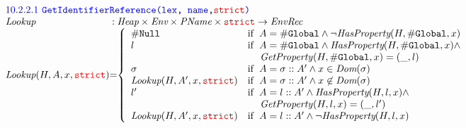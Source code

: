 \documentclass[a4paper, leqno]{amsart}
\def\inred{\color{red}}
\def\inblue{\color{blue}}
\newcommand{\strict}{{\inred\tt strict}}
\newcommand{\nullL}{{\tt \#Null}}
\newcommand{\er}{\ensuremath{\sigma}}
\newcommand{\pname}{\emph{PName}}
\newcommand{\Heap}{\emph{Heap}}
\newcommand{\Env}{\emph{Env}}
\renewcommand{\lg}{{\tt \#Global}}
\newcommand{\hf}[1]{\emph{#1}}
\newcommand{\varloc}[1]{{\tt \##1}}
\newcommand{\ifc}[1]{{\rm if}\begin{array}[t]{l}#1\end{array}}
\def\inred{\color{red}}
\def\inblue{\color{blue}}
\begin{document}
\[\begin{array}{l@{}c@{}l}
\multicolumn{3}{l}{\mbox{\inblue 10.2.2.1 {\tt GetIdentifierReference(lex, name,{\inred strict})}}}\\
\hf{Lookup} & :& \Heap \times \Env \times \pname \times \strict \rightarrow \emph{EnvRec} \\
\hf{Lookup}(H,A,x,\strict) &=&
\left\{\begin{array}{ll}
\nullL & \ifc{A = \lg \wedge \neg\hf{HasProperty}(H,\varloc{Global},x)}\\
l & \ifc{A = \lg \wedge \hf{HasProperty}(H,\varloc{Global},x) \wedge} \\
& \mbox{\phantom{if }  \hf{GetProperty}$(H,\varloc{Global},x)=(\_, l)$} \\
\er &\ifc{A = \er::A'\wedge x\in\hf{Dom}(\er)} \\
\hf{Lookup}(H, A',x,\strict) &\ifc{A = \er::A'\wedge x\not\in\hf{Dom}(\er)}\\
l'  &\ifc{A = l::A' \wedge \hf{HasProperty}(H,l,x) \wedge} \\
& \mbox{\phantom{if }  \hf{GetProperty}$(H,l,x)=(\_, l')$} \\
\hf{Lookup}(H, A',x,\strict) &\ifc{A = l::A' \wedge \neg\hf{HasProperty}(H,l,x)} \\
\end{array}\right.
\\[2em]
\end{array}
\]
\end{document}
